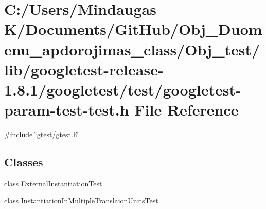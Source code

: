 \hypertarget{_obj__test_2lib_2googletest-release-1_88_81_2googletest_2test_2googletest-param-test-test_8h}{}\section{C\+:/\+Users/\+Mindaugas K/\+Documents/\+Git\+Hub/\+Obj\+\_\+\+Duomenu\+\_\+apdorojimas\+\_\+class/\+Obj\+\_\+test/lib/googletest-\/release-\/1.8.1/googletest/test/googletest-\/param-\/test-\/test.h File Reference}
\label{_obj__test_2lib_2googletest-release-1_88_81_2googletest_2test_2googletest-param-test-test_8h}
{\ttfamily \#include \char`\"{}gtest/gtest.\+h\char`\"{}}\newline
\subsection*{Classes}
\begin{DoxyCompactItemize}
\item 
class \mbox{\hyperlink{class_external_instantiation_test}{External\+Instantiation\+Test}}
\item 
class \mbox{\hyperlink{class_instantiation_in_multiple_translaion_units_test}{Instantiation\+In\+Multiple\+Translaion\+Units\+Test}}
\end{DoxyCompactItemize}
